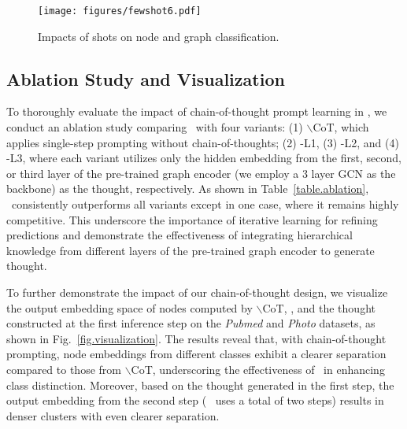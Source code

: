 \begin{figure}[t]
\centering
\texttt{[image: figures/fewshot6.pdf]}
\caption{Impacts of shots on node and graph classification.}
\label{fig.fewshot}
\end{figure}

\subsection{Ablation Study and Visualization}\label{sec.ablation}
To thoroughly evaluate the impact of chain-of-thought prompt learning in \model, we conduct an ablation study comparing \model\ with four  variants:  
(1) \model$\backslash$CoT, which applies single-step prompting without chain-of-thoughts;  
(2) \model-L1, (3) \model-L2, and (4) \model-L3, where each variant utilizes only the hidden embedding from the first, second, or third layer of the pre-trained graph encoder (we employ a 3 layer GCN as the backbone) as the thought, respectively.
As shown in Table~\ref{table.ablation}, \model\ consistently outperforms all variants except in one case, where it remains highly competitive. This underscore the importance of iterative learning for refining predictions and demonstrate the effectiveness of integrating hierarchical knowledge from different layers of the pre-trained graph encoder to generate thought.

To further demonstrate the impact of our chain-of-thought design, we visualize the output embedding space of nodes computed by \model$\backslash$CoT, \model, and the thought constructed at the first inference step on the \textit{Pubmed} and \textit{Photo} datasets, as shown in Fig.~\ref{fig.visualization}. The results reveal that, with chain-of-thought prompting, node embeddings from different classes exhibit a clearer separation compared to those from \model$\backslash$CoT, underscoring the effectiveness of \model\ in enhancing class distinction. Moreover, based on the thought generated in the first step, %
the output embedding from the second step ( \model\ uses a total of two steps) results in denser clusters with even clearer separation. 


